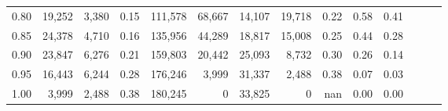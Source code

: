 \begin{tabular}{rrrrrrrrrrrrrr}
0.80 &  19,252 &  3,380 &  0.15 &  111,578 &   68,667 &  14,107 &  19,718 &  0.22 &  0.58 &      0.41 \\
0.85 &  24,378 &  4,710 &  0.16 &  135,956 &   44,289 &  18,817 &  15,008 &  0.25 &  0.44 &      0.28 \\
0.90 &  23,847 &  6,276 &  0.21 &  159,803 &   20,442 &  25,093 &   8,732 &  0.30 &  0.26 &      0.14 \\
0.95 &  16,443 &  6,244 &  0.28 &  176,246 &    3,999 &  31,337 &   2,488 &  0.38 &  0.07 &      0.03 \\
1.00 &   3,999 &  2,488 &  0.38 &  180,245 &        0 &  33,825 &       0 &   nan &  0.00 &      0.00 \\
\bottomrule
\end{tabular}
